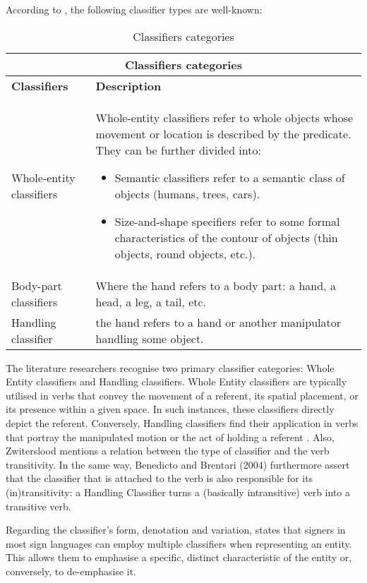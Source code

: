 According to \cite{kimmelman2020}, the following classifier types are well-known:


\begin{table}[H]
\centering 
\begin{tabular}{ |p{4cm}|p{7cm}|}
\hline
\multicolumn{2}{|c|}{\textbf{Classifiers categories}} \\
\hline
 \textbf{Classifiers} & \textbf{Description} \\
\hline
Whole-entity classifiers & Whole-entity classifiers refer to whole objects whose movement or location is described by the predicate. They can be further divided into:
\begin{itemize}
    \item Semantic classifiers refer to a semantic class of objects (humans, trees, cars). 
    \item Size-and-shape specifiers refer to some formal characteristics of the contour of objects (thin objects, round objects, etc.). 
\end{itemize}\\
\hline
Body-part classifiers & Where the hand refers to a body part: a hand, a head, a leg, a tail, etc.\\ 
\hline
Handling classifier & the hand refers to a hand or another manipulator handling some object.\\ 
\hline
\end{tabular}
\caption{Classifiers categories}
\label{tab:asl_classifiers}
\end{table}

The literature researchers recognise two primary classifier categories: Whole Entity 
classifiers and Handling classifiers. Whole Entity classifiers are typically utilised 
in verbs that convey the movement of a referent, its spatial placement, or its 
presence within a given space. In such instances, these classifiers directly depict 
the referent. Conversely, Handling classifiers find their application in verbs that 
portray the manipulated motion or the act of holding a referent \parencite{zwitserlood2012}. 
Also, Zwiterslood mentions a relation between the type of classifier and the verb 
transitivity. In the same way, Benedicto and Brentari (2004) furthermore assert that 
the classifier that is attached to the verb is also responsible for its 
(in)transitivity: a Handling Classifier turns a (basically intransitive) verb into a 
transitive verb.

Regarding the classifier's form, denotation and variation, \textcite{zwitserlood2012} states 
that signers in most sign languages can employ multiple classifiers when representing 
an entity. This allows them to emphasise a specific, distinct characteristic of the 
entity or, conversely, to de-emphasise it.

